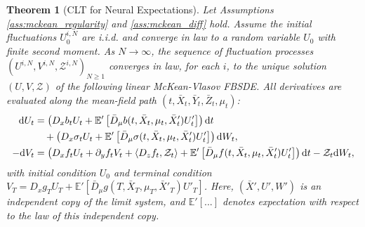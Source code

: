 \documentclass[qian]{imsart}
\newcommand{\E}{\mathbb{E}}
\newcommand{\dd}{\mathrm{d}}
\newcommand{\scpr}[2]{\left\langle #1, #2 \right\rangle}
\theoremstyle{plain}
\newtheorem{theorem}{Theorem}[section]
\theoremstyle{definition}
\begin{document}
\begin{theorem}[CLT for Neural Expectations]\label{thm:clt}
Let Assumptions \ref{ass:mckean_regularity} and \ref{ass:mckean_diff} hold. Assume the initial fluctuations $U^{i,N}_0$ are i.i.d. and converge in law to a random variable $U_0$ with finite second moment. As $N \to \infty$, the sequence of fluctuation processes $(U^{i,N}, V^{i,N}, \mathcal{Z}^{i,N})_{N \ge 1}$ converges in law, for each $i$, to the unique solution $(U, V, \mathcal{Z})$ of the following linear McKean-Vlasov FBSDE. All derivatives are evaluated along the mean-field path $(t, \bar{X}_t, \bar{Y}_t, \bar{Z}_t, \mu_t)$:
\begin{align}
\dd U_t &= \left( D_x b_t U_t + \E'\left[\bar{D}_\mu b(t, \bar{X}_t, \mu_t, \bar{X}'_t) U'_t\right] \right) \dd t \notag \\
&\quad+ \left( D_x \sigma_t U_t + \E'\left[\bar{D}_\mu \sigma(t, \bar{X}_t, \mu_t, \bar{X}'_t) U'_t\right] \right) \dd W_t, \label{eq:clt_fwd} \\
-\dd V_t &= \left( D_x f_t U_t + \partial_y f_t V_t + \scpr{D_z f_t}{\mathcal{Z}_t} + \E'\left[\bar{D}_\mu f(t, \bar{X}_t, \mu_t, \bar{X}'_t) U'_t \right] \right) \dd t - \mathcal{Z}_t \dd W_t, \label{eq:clt_bwd}
\end{align}
with initial condition $U_0$ and terminal condition $V_T = D_x g_T U_T + \E'\left[\bar{D}_\mu g(T, \bar{X}_T, \mu_T, \bar{X}'_T) U'_T\right]$. Here, $(\bar{X}', U', W')$ is an independent copy of the limit system, and $\E'[...]$ denotes expectation with respect to the law of this independent copy.
\end{theorem}
\end{document}
